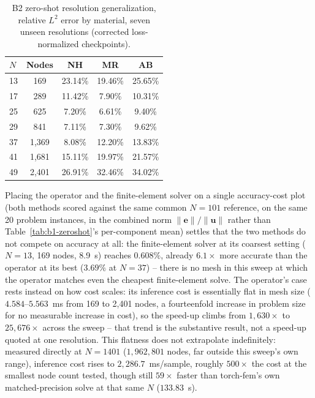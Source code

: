 \documentclass[final,5p,times]{elsarticle}
\begin{document}
\begin{table}[h]
\centering
\caption{B2 zero-shot resolution generalization, relative $L^2$ error by
  material, seven unseen resolutions (corrected loss-normalized
  checkpoints).}
\label{tab:b2-zeroshot}
\small
\begin{tabular}{lcccc}
\toprule
$N$ & Nodes & NH & MR & AB \\
\midrule
13 & 169   & 23.14\% & 19.46\% & 25.65\% \\
17 & 289   & 11.42\% & 7.90\%  & 10.31\% \\
25 & 625   & 7.20\%  & 6.61\%  & 9.40\%  \\
29 & 841   & 7.11\%  & 7.30\%  & 9.62\%  \\
37 & 1{,}369 & 8.08\% & 12.20\% & 13.83\% \\
41 & 1{,}681 & 15.11\% & 19.97\% & 21.57\% \\
49 & 2{,}401 & 26.91\% & 32.46\% & 34.02\% \\
\bottomrule
\end{tabular}
\end{table}

Placing the operator and the finite-element solver on a single
accuracy-cost plot (both methods scored against the same common $N{=}101$
reference, on the same 20 problem instances, in the combined norm
$\|\mathbf{e}\|/\|\mathbf{u}\|$ rather than
Table~\ref{tab:b1-zeroshot}'s per-component mean) settles that the two methods
do not compete on accuracy at all: the finite-element solver at its
coarsest setting ($N{=}13$, 169 nodes, 8.9~s) reaches $0.608\%$, already
$6.1\times$ more accurate than the operator at its best ($3.69\%$ at
$N{=}37$) -- there is no mesh in this sweep at which the operator matches
even the cheapest finite-element solve. The operator's case rests instead
on how cost scales: its inference cost is essentially flat in mesh size
($4.584$--$5.563$~ms from 169 to 2,401 nodes, a fourteenfold increase in
problem size for no measurable increase in cost), so the speed-up climbs
from $1{,}630\times$ to $25{,}676\times$ across the sweep -- that trend is
the substantive result, not a speed-up quoted at one resolution. This
flatness does not extrapolate indefinitely: measured directly at $N{=}1401$
($1{,}962{,}801$ nodes, far outside this sweep's own range), inference cost
rises to $2{,}286.7$~ms/sample, roughly $500\times$ the cost at the
smallest node count tested, though still $59\times$ faster than torch-fem's
own matched-precision solve at that same $N$ ($133.83$~s).
\end{document}
